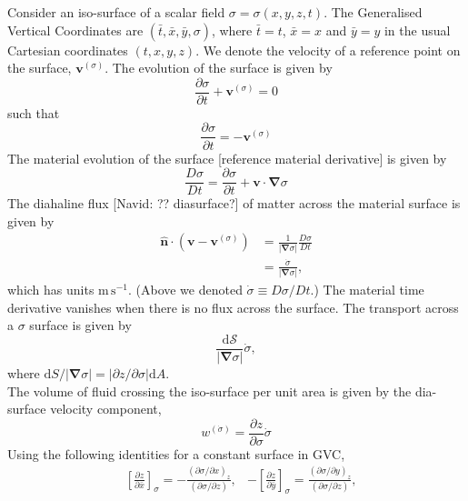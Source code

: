 Consider an iso-surface of a scalar field $\sigma = \sigma(x,y,z,t)$. The Generalised Vertical Coordinates are $(\bar{t}, \bar{x}, \bar{y}, \sigma)$, where $\bar{t}=t$, $\bar{x}=x$ and $\bar{y}=y$ in the usual Cartesian coordinates $(t,x,y,z)$. We denote the velocity of a reference point on the surface, $\mathbf{v}^{(\sigma)}$. The evolution of the surface is given by
\begin{equation}
    \frac{\partial \sigma}{\partial t} + \mathbf{v}^{(\sigma)} = 0
\end{equation}
such that
\begin{equation}
    \frac{\partial \sigma}{\partial t} = -\mathbf{v}^{(\sigma)}
\end{equation}
The material evolution of the surface [reference material derivative] is given by
\begin{equation}
    \frac{D \sigma}{D t} = \frac{\partial \sigma}{\partial t} + \mathbf{v}\cdot \boldsymbol{\nabla} \sigma
\end{equation}
The diahaline flux {\color{red}[Navid: ?? diasurface?]} of matter across the material surface is given by
\begin{align}
    \hat{\mathbf{n}}\cdot (\mathbf{v}-\mathbf{v}^{(\sigma)})&= \frac{1}{|\boldsymbol{\nabla} \sigma|} \frac{D \sigma }{D t} \\
    &= \frac{\dot{\sigma}}{|\boldsymbol{\nabla} \sigma|},
\end{align}
which has units $\text{m}\,\text{s}^{-1}$. {\color{red}(Above we denoted $\dot\sigma\equiv D\sigma/Dt$.)} The material time derivative vanishes when there is no flux across the surface. The transport across a $\sigma$ surface is given by
\begin{equation}
    \frac{\text{d}\mathcal{S}}{|\boldsymbol{\nabla} \sigma|}\dot{\sigma},
\end{equation}
where $\text{d} S\big/|\boldsymbol{\nabla} \sigma|=\left| \partial z\big/\partial \sigma\right|\text{d}A$. \\
\newline
The volume of fluid crossing the iso-surface per unit area is given by the dia-surface velocity component,
\begin{equation}
    w^{(\dot{\sigma})}=\frac{\partial z}{\partial \sigma}\dot{\sigma}
\end{equation}
Using the following identities for a constant surface in GVC,
\begin{align}
    &\left[\frac{\partial z}{\partial \bar{x}} \right]_{\sigma} = -\frac{(\partial \sigma/\partial x)_{z}}{(\partial \sigma /\partial z)}, & -\left[\frac{\partial z}{\partial \bar{y}} \right]_{\sigma}=\frac{(\partial \sigma/\partial y)_{z}}{(\partial \sigma /\partial z)},
\end{align}

